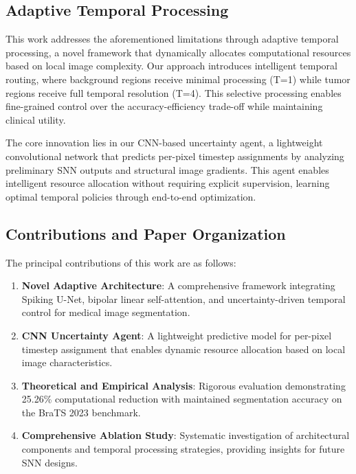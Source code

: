 \documentclass[12pt,a4paper]{article}
\begin{document}
\subsection{Adaptive Temporal Processing}

This work addresses the aforementioned limitations through adaptive temporal processing, a novel framework that dynamically allocates computational resources based on local image complexity. Our approach introduces intelligent temporal routing, where background regions receive minimal processing (T=1) while tumor regions receive full temporal resolution (T=4). This selective processing enables fine-grained control over the accuracy-efficiency trade-off while maintaining clinical utility.

The core innovation lies in our CNN-based uncertainty agent, a lightweight convolutional network that predicts per-pixel timestep assignments by analyzing preliminary SNN outputs and structural image gradients. This agent enables intelligent resource allocation without requiring explicit supervision, learning optimal temporal policies through end-to-end optimization.

\subsection{Contributions and Paper Organization}

The principal contributions of this work are as follows:

\begin{enumerate}[label=\roman*.]
\item \textbf{Novel Adaptive Architecture}: A comprehensive framework integrating Spiking U-Net, bipolar linear self-attention, and uncertainty-driven temporal control for medical image segmentation.

\item \textbf{CNN Uncertainty Agent}: A lightweight predictive model for per-pixel timestep assignment that enables dynamic resource allocation based on local image characteristics.

\item \textbf{Theoretical and Empirical Analysis}: Rigorous evaluation demonstrating 25.26\% computational reduction with maintained segmentation accuracy on the BraTS 2023 benchmark.

\item \textbf{Comprehensive Ablation Study}: Systematic investigation of architectural components and temporal processing strategies, providing insights for future SNN designs.
\end{enumerate}
\end{document}
